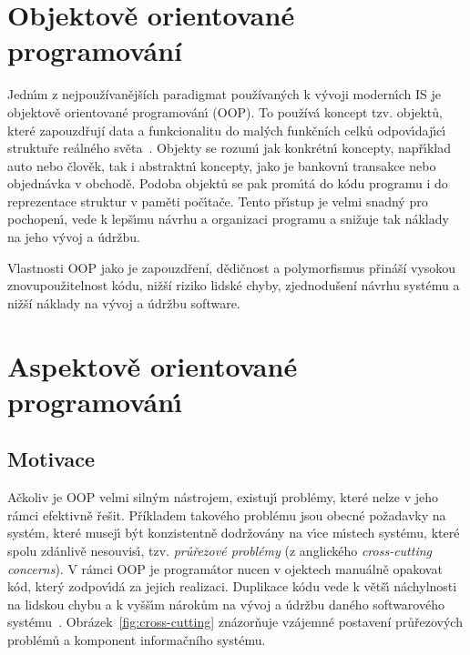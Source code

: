 \section{Objektově orientované programování}\label{sec:oop}

Jedn\'{\i}m z nejpoužívanějších paradigmat používaných k
v\'yvoji modern\'{\i}ch \gls{IS} je objektově orientované programován\'{\i} (\gls{OOP}).
To používá koncept tzv. objektů, které zapouzdřují data a funkcionalitu do
malých funkčních celků odpov\'{\i}daj\'{\i}c\'{\i} struktuře reálného světa~\cite{rentsch1982object}.
Objekty se rozum\'{\i} jak konkrétn\'{\i} koncepty, např\'{\i}klad auto nebo člověk, tak i
abstraktn\'{\i} koncepty, jako je bankovn\'{\i} transakce nebo objednávka v obchodě.
Podoba objektů se pak prom\'{\i}tá do kódu programu i do reprezentace struktur v paměti
poč\'{\i}tače. Tento př\'{\i}stup je velmi snadn\'y pro pochopen\'{\i},
vede k lepš\'{\i}mu návrhu a organizaci programu a snižuje
tak náklady na jeho v\'yvoj a údržbu.

Vlastnosti \gls{OOP} jako je zapouzdření, dědičnost a polymorfismus přináší
vysokou znovupoužitelnost kódu, nižší riziko lidské chyby, zjednodušení
návrhu systému a nižší náklady na vývoj a údržbu software.

\section{Aspektově orientované programován\'{\i}}\label{sec:aop}



\subsection{Motivace}


Ačkoliv je \gls{OOP} velmi siln\'ym nástrojem, existuj\'{\i} problémy,
které nelze v jeho rámci efektivně řešit.
Příkladem takového problému jsou obecné požadavky na systém,
které musej\'{\i} b\'yt konzistentně dodržovány na v\'{\i}ce
m\'{\i}stech systému, které spolu zdánlivě nesouvis\'{\i},
tzv. \textit{průřezové problémy} (z anglického \textit{cross-cutting concerns}).
V rámci \gls{OOP} je programátor nucen v ojektech manuálně opakovat
kód, kter\'y zodpov\'{\i}dá za jejich realizaci. Duplikace kódu
vede k větš\'{\i} náchylnosti na lidskou chybu a k vyšš\'{\i}m nárokům na v\'yvoj
a údržbu daného softwarového systému~\cite{fowler1999refactoring}.
Obrázek~\ref{fig:cross-cutting} znázorňuje vzájemné postavení průřezových
problémů a komponent informačního systému.

